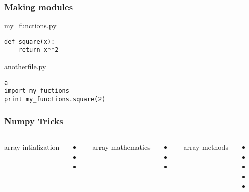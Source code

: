 \begin{frame}[fragile]

    \frametitle{Making modules}

my\_functions.py
\begin{lstlisting}
def square(x):
    return x**2

\end{lstlisting}

\bigskip

anotherfile.py
\begin{lstlisting}a
import my_fuctions
print my_functions.square(2)
\end{lstlisting}

\end{frame}


\begin{frame}[fragile]

    \frametitle{Numpy Tricks}


    \begin{columns}[t]


            array intialization

            \begin{itemize}
                \item {}

                \item {}

                \item {}

            \end{itemize}




            array mathematics

            \begin{itemize}
                \item {}
                \item \code{ += }
                \item {}
            \end{itemize}

            array methods

            \begin{itemize}
                \item {}
                \item {}
                \item {}
                \item {}
                \item {}
            \end{itemize}

    \end{columns}

\end{frame}


